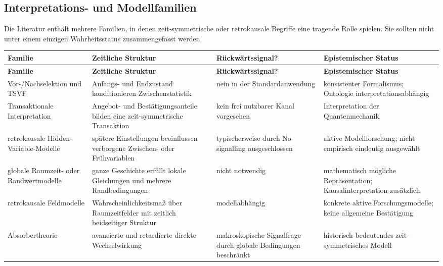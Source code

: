 \documentclass[11pt,a4paper]{article}
\theoremstyle{remark}
\begin{document}
\subsection{Interpretations- und Modellfamilien}

Die Literatur enthält mehrere Familien, in denen zeit-symmetrische oder
retrokausale Begriffe eine tragende Rolle spielen. Sie sollten nicht unter
einem einzigen Wahrheitsstatus zusammengefasst werden.

\begin{longtable}{>{\raggedright\arraybackslash}p{}
                  >{\raggedright\arraybackslash}p{}
                  >{\raggedright\arraybackslash}p{}
                  >{\raggedright\arraybackslash}p{}}
\toprule
\textbf{Familie} & \textbf{Zeitliche Struktur} & \textbf{Rückwärtssignal?} & \textbf{Epistemischer Status} \\
\midrule
\endfirsthead
\toprule
\textbf{Familie} & \textbf{Zeitliche Struktur} & \textbf{Rückwärtssignal?} & \textbf{Epistemischer Status} \\
\midrule
\endhead
Vor-/Nachselektion und TSVF & Anfangs- und Endzustand konditionieren Zwischenstatistik & nein in der Standardanwendung & konsistenter Formalismus; Ontologie interpretations\-abhängig \\
Transaktionale Interpretation & Angebot- und Bestätigungsanteile bilden eine zeit-symmetrische Transaktion & kein frei nutzbarer Kanal vorgesehen & Interpretation der Quantenmechanik \citep{Cramer1986} \\
retrokausale Hidden-Variable-Modelle & spätere Einstellungen beeinflussen verborgene Zwischen- oder Frühvariablen & typischerweise durch No-signalling ausgeschlossen & aktive Modellforschung; nicht empirisch eindeutig ausgewählt \\
globale Raumzeit- oder Randwertmodelle & ganze Geschichte erfüllt lokale Gleichungen und mehrere Randbedingungen & nicht notwendig & mathematisch mögliche Repräsentation; Kausalinterpretation zusätzlich \\
retrokausale Feldmodelle & Wahrscheinlichkeitsmaß über Raumzeitfelder mit zeitlich beidseitiger Struktur & modellabhängig & konkrete aktive Forschungsmodelle; keine allgemeine Bestätigung \citep{WhartonArgaman2020} \\
Absorbertheorie & avancierte und retardierte direkte Wechselwirkung & makroskopische Signalfrage durch globale Bedingungen beschränkt & historisch bedeutendes zeit-symmetrisches Modell \\
\bottomrule
\end{longtable}
\end{document}
